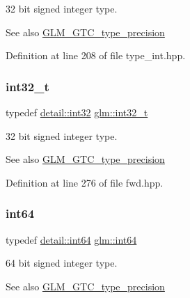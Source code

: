 32 bit signed integer type. \begin{DoxySeeAlso}{See also}
\mbox{\hyperlink{group__gtc__type__precision}{G\+L\+M\+\_\+\+G\+T\+C\+\_\+type\+\_\+precision}} 
\end{DoxySeeAlso}


Definition at line 208 of file type\+\_\+int.\+hpp.

\mbox{\label{group__gtc__type__precision_gab870c0eb6f525b0c8c4716762e0fc3a8}} 
\subsubsection{\texorpdfstring{int32\_t}{int32\_t}}
{\footnotesize\ttfamily typedef \mbox{\hyperlink{namespaceglm_1_1detail_a9f85b4efeca416cdcec2fd08939a2e17}{detail\+::int32}} \mbox{\hyperlink{group__gtc__type__precision_gab870c0eb6f525b0c8c4716762e0fc3a8}{glm\+::int32\+\_\+t}}}

32 bit signed integer type. \begin{DoxySeeAlso}{See also}
\mbox{\hyperlink{group__gtc__type__precision}{G\+L\+M\+\_\+\+G\+T\+C\+\_\+type\+\_\+precision}} 
\end{DoxySeeAlso}


Definition at line 276 of file fwd.\+hpp.

\mbox{\label{group__gtc__type__precision_ga435d75819cce297cc5fa21bd84ef89a5}} 
\subsubsection{\texorpdfstring{int64}{int64}}
{\footnotesize\ttfamily typedef \mbox{\hyperlink{namespaceglm_1_1detail_a5b1c3227ec636c24a0676746381adfc8}{detail\+::int64}} \mbox{\hyperlink{group__gtc__type__precision_ga435d75819cce297cc5fa21bd84ef89a5}{glm\+::int64}}}

64 bit signed integer type. \begin{DoxySeeAlso}{See also}
\mbox{\hyperlink{group__gtc__type__precision}{G\+L\+M\+\_\+\+G\+T\+C\+\_\+type\+\_\+precision}} 
\end{DoxySeeAlso}


